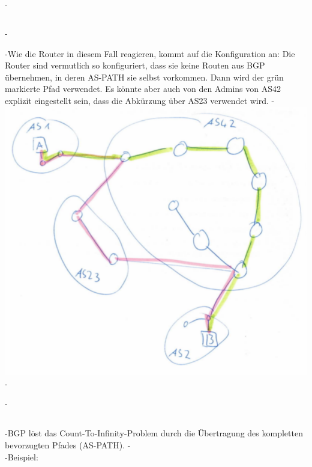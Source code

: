 \documentclass[a4paper,
			llpt,
			solution,
			accentcolor=tud2d,
			colorbacktitle
			]
			{tudexercise}
\newcommand{\8}{$\infty$}
\begin{document}
-\subsection{}
-\begin{multicols}{2}
-Wie die Router in diesem Fall reagieren, kommt auf die Konfiguration an: Die Router sind vermutlich so konfiguriert, dass sie keine Routen aus BGP übernehmen, in deren AS-PATH sie selbst vorkommen. Dann wird der grün markierte Pfad verwendet. Es könnte aber auch von den Admins von AS42 explizit eingestellt sein, dass die Abkürzung über AS23 verwendet wird. \vfill \columnbreak
-\includegraphics[scale=0.5]{4_3_2.pdf}
-\end{multicols}
-\subsection{}
-BGP löst das Count-To-Infinity-Problem durch die Übertragung des kompletten bevorzugten Pfades (AS-PATH).
-\\
-Beispiel:
\end{document}
